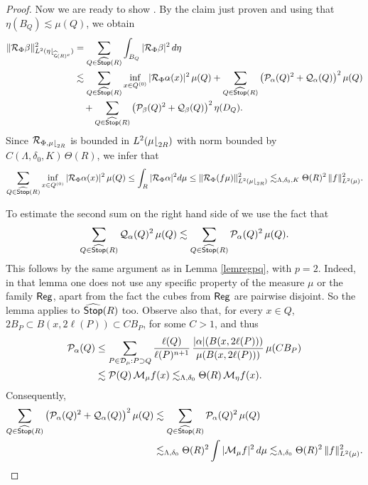 \begin{proof}
Now we are ready to show . By the claim just proven and using that
$\eta(B_Q)\lesssim\mu(Q)$, we obtain
\begin{align}\label{eqdhvn43}
\|{\mathcal R}_\Phi \beta\|_{L^2(\eta{\lfloor}_{{\widehat{{\mathsf{G}}}}(R)^c})}^2 & =
\sum_{Q\in{\widehat{{\mathsf {Stop}}}}(R)} \int_{B_Q} |{\mathcal R}_\Phi \beta|^2\,d\eta\\
& \lesssim \sum_{Q\in{\widehat{{\mathsf {Stop}}}}(R)} \inf_{x\in Q^{(0)}}|{\mathcal R}_\Phi \alpha(x)|^2\,\mu(Q) + 
\sum_{Q\in{\widehat{{\mathsf {Stop}}}}(R)}\big({\mathcal P}_\alpha(Q)^2 + {\mathcal Q}_\alpha(Q)\big)^2\,\mu(Q) \nonumber\\
 &\quad+ 
\sum_{Q\in{\widehat{{\mathsf {Stop}}}}(R)}\big({\mathcal P}_\beta(Q)^2 + {\mathcal Q}_\beta(Q)\big)^2\,\eta(D_Q).\nonumber
\end{align}
Since ${\mathcal R}_{\Phi,\mu{\lfloor}_{2R}}$ is bounded in $L^2(\mu{\lfloor}_{2R})$ with norm bounded by 
$C(\Lambda,\delta_0,K)\,\Theta(R)$, we infer that
\begin{align*}
\sum_{Q\in{\widehat{{\mathsf {Stop}}}}(R)} \inf_{x\in Q^{(0)}}|{\mathcal R}_\Phi \alpha(x)|^2\,\mu(Q)
\leq \int_R |{\mathcal R}_\Phi \alpha|^2d\mu \leq \|{\mathcal R}_\Phi (f\mu)\|^2_{L^2(\mu{\lfloor}_{2R})}
\lesssim_{\Lambda,\delta_0,K} \Theta(R)^2\,\|f\|_{L^2(\mu)}^2.
\end{align*}

To estimate the second sum on the right hand side of  we use the fact
that
$$\sum_{Q\in{\widehat{{\mathsf {Stop}}}}(R)}{\mathcal Q}_\alpha(Q)^2\,\mu(Q) \lesssim 
\sum_{Q\in{\widehat{{\mathsf {Stop}}}}(R)}{\mathcal P}_\alpha(Q)^2\,\mu(Q).$$
This follows by the same argument as in Lemma \ref{lemregpq}, with $p=2$. Indeed, in that lemma
one does not use any specific property of the measure $\mu$ or the family ${\mathsf{Reg}}$, apart from the
fact the cubes from ${\mathsf{Reg}}$ are pairwise disjoint. So the lemma applies to ${\widehat{{\mathsf {Stop}}}}(R)$ too.
Observe also that, for every $x\in Q$, $2B_P\subset B(x,2\ell(P))\subset CB_P$, for some $C>1$, and thus
\begin{align*}
{\mathcal P}_\alpha(Q) &\leq \sum_{P\in{\mathcal D}_\mu:P\supset Q} \frac{\ell(Q)}{\ell(P)^{n+1}} \,
\frac{|\alpha|(B(x,2\ell(P)))}{\mu(B(x,2\ell(P)))}\,\mu(CB_P) \\
&\lesssim {\mathcal P}(Q)\,{\mathcal M}_\mu f(x)\lesssim_{\Lambda,\delta_0}\Theta(R)\,{\mathcal M}_\eta f(x).
\end{align*}
Consequently,
\begin{align*}
\sum_{Q\in{\widehat{{\mathsf {Stop}}}}(R)}\big({\mathcal P}_\alpha(Q)^2 + {\mathcal Q}_\alpha(Q)\big)^2\,\mu(Q) &
\lesssim \sum_{Q\in{\widehat{{\mathsf {Stop}}}}(R)}{\mathcal P}_\alpha(Q)^2\,\mu(Q) \\
&\lesssim_{\Lambda,\delta_0}\Theta(R)^2
\int |{\mathcal M}_\mu f|^2\,d\mu\lesssim_{\Lambda,\delta_0}\Theta(R)^2\,\|f\|_{L^2(\mu)}^2.
\end{align*}


\end{proof}
